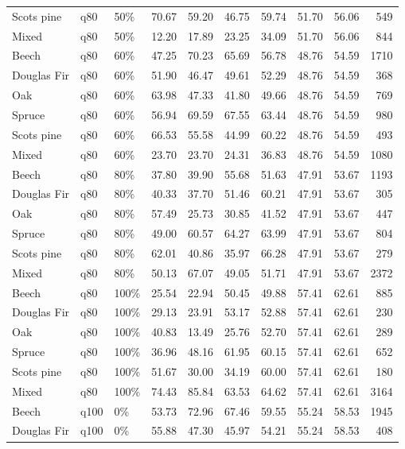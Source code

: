 \begin{longtable}{lllrrrrrrr}
  Scots pine & q80 & 50\% & 70.67 & 59.20 & 46.75 & 59.74 & 51.70 & 56.06 & 549 \\ 
  Mixed & q80 & 50\% & 12.20 & 17.89 & 23.25 & 34.09 & 51.70 & 56.06 & 844 \\ 
  Beech & q80 & 60\% & 47.25 & 70.23 & 65.69 & 56.78 & 48.76 & 54.59 & 1710 \\ 
  Douglas Fir & q80 & 60\% & 51.90 & 46.47 & 49.61 & 52.29 & 48.76 & 54.59 & 368 \\ 
  Oak & q80 & 60\% & 63.98 & 47.33 & 41.80 & 49.66 & 48.76 & 54.59 & 769 \\ 
  Spruce & q80 & 60\% & 56.94 & 69.59 & 67.55 & 63.44 & 48.76 & 54.59 & 980 \\ 
  Scots pine & q80 & 60\% & 66.53 & 55.58 & 44.99 & 60.22 & 48.76 & 54.59 & 493 \\ 
  Mixed & q80 & 60\% & 23.70 & 23.70 & 24.31 & 36.83 & 48.76 & 54.59 & 1080 \\ 
  Beech & q80 & 80\% & 37.80 & 39.90 & 55.68 & 51.63 & 47.91 & 53.67 & 1193 \\ 
  Douglas Fir & q80 & 80\% & 40.33 & 37.70 & 51.46 & 60.21 & 47.91 & 53.67 & 305 \\ 
  Oak & q80 & 80\% & 57.49 & 25.73 & 30.85 & 41.52 & 47.91 & 53.67 & 447 \\ 
  Spruce & q80 & 80\% & 49.00 & 60.57 & 64.27 & 63.99 & 47.91 & 53.67 & 804 \\ 
  Scots pine & q80 & 80\% & 62.01 & 40.86 & 35.97 & 66.28 & 47.91 & 53.67 & 279 \\ 
  Mixed & q80 & 80\% & 50.13 & 67.07 & 49.05 & 51.71 & 47.91 & 53.67 & 2372 \\ 
  Beech & q80 & 100\% & 25.54 & 22.94 & 50.45 & 49.88 & 57.41 & 62.61 & 885 \\ 
  Douglas Fir & q80 & 100\% & 29.13 & 23.91 & 53.17 & 52.88 & 57.41 & 62.61 & 230 \\ 
  Oak & q80 & 100\% & 40.83 & 13.49 & 25.76 & 52.70 & 57.41 & 62.61 & 289 \\ 
  Spruce & q80 & 100\% & 36.96 & 48.16 & 61.95 & 60.15 & 57.41 & 62.61 & 652 \\ 
  Scots pine & q80 & 100\% & 51.67 & 30.00 & 34.19 & 60.00 & 57.41 & 62.61 & 180 \\ 
  Mixed & q80 & 100\% & 74.43 & 85.84 & 63.53 & 64.62 & 57.41 & 62.61 & 3164 \\ 
  Beech & q100 & 0\% & 53.73 & 72.96 & 67.46 & 59.55 & 55.24 & 58.53 & 1945 \\ 
  Douglas Fir & q100 & 0\% & 55.88 & 47.30 & 45.97 & 54.21 & 55.24 & 58.53 & 408 \\ 

\end{longtable}
